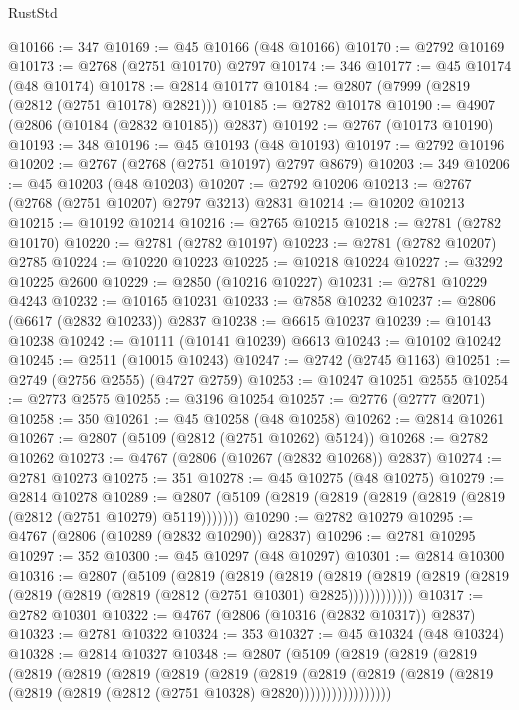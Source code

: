 \begin{lexlean}{RustStd}
\begin{coremodule}
@10166 := 347
@10169 := @45 @10166 (@48 @10166)
@10170 := @2792 @10169
@10173 := @2768 (@2751 @10170) @2797
@10174 := 346
@10177 := @45 @10174 (@48 @10174)
@10178 := @2814 @10177
@10184 := @2807 (@7999 (@2819 (@2812 (@2751 @10178) @2821)))
@10185 := @2782 @10178
@10190 := @4907 (@2806 (@10184 (@2832 @10185)) @2837)
@10192 := @2767 (@10173 @10190)
@10193 := 348
@10196 := @45 @10193 (@48 @10193)
@10197 := @2792 @10196
@10202 := @2767 (@2768 (@2751 @10197) @2797 @8679)
@10203 := 349
@10206 := @45 @10203 (@48 @10203)
@10207 := @2792 @10206
@10213 := @2767 (@2768 (@2751 @10207) @2797 @3213) @2831
@10214 := @10202 @10213
@10215 := @10192 @10214
@10216 := @2765 @10215
@10218 := @2781 (@2782 @10170)
@10220 := @2781 (@2782 @10197)
@10223 := @2781 (@2782 @10207) @2785
@10224 := @10220 @10223
@10225 := @10218 @10224
@10227 := @3292 @10225 @2600
@10229 := @2850 (@10216 @10227)
@10231 := @2781 @10229 @4243
@10232 := @10165 @10231
@10233 := @7858 @10232
@10237 := @2806 (@6617 (@2832 @10233)) @2837
@10238 := @6615 @10237
@10239 := @10143 @10238
@10242 := @10111 (@10141 @10239) @6613
@10243 := @10102 @10242
@10245 := @2511 (@10015 @10243)
@10247 := @2742 (@2745 @1163)
@10251 := @2749 (@2756 @2555) (@4727 @2759)
@10253 := @10247 @10251 @2555
@10254 := @2773 @2575
@10255 := @3196 @10254
@10257 := @2776 (@2777 @2071)
@10258 := 350
@10261 := @45 @10258 (@48 @10258)
@10262 := @2814 @10261
@10267 := @2807 (@5109 (@2812 (@2751 @10262) @5124))
@10268 := @2782 @10262
@10273 := @4767 (@2806 (@10267 (@2832 @10268)) @2837)
@10274 := @2781 @10273
@10275 := 351
@10278 := @45 @10275 (@48 @10275)
@10279 := @2814 @10278
@10289 := @2807 (@5109 (@2819 (@2819 (@2819 (@2819 (@2819 (@2812 (@2751 @10279) @5119)))))))
@10290 := @2782 @10279
@10295 := @4767 (@2806 (@10289 (@2832 @10290)) @2837)
@10296 := @2781 @10295
@10297 := 352
@10300 := @45 @10297 (@48 @10297)
@10301 := @2814 @10300
@10316 := @2807
    (@5109
      (@2819
        (@2819
          (@2819
            (@2819 (@2819 (@2819 (@2819 (@2819 (@2819 (@2819 (@2812 (@2751 @10301) @2825))))))))))))
@10317 := @2782 @10301
@10322 := @4767 (@2806 (@10316 (@2832 @10317)) @2837)
@10323 := @2781 @10322
@10324 := 353
@10327 := @45 @10324 (@48 @10324)
@10328 := @2814 @10327
@10348 := @2807
    (@5109
      (@2819
        (@2819
          (@2819
            (@2819
              (@2819
                (@2819
                  (@2819
                    (@2819
                      (@2819
                        (@2819
                          (@2819
                            (@2819 (@2819 (@2819 (@2819 (@2812 (@2751 @10328) @2820)))))))))))))))))

\end{coremodule}
\end{lexlean}
